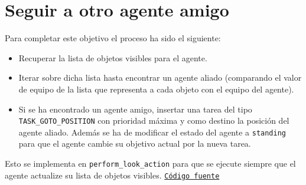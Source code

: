 \documentclass[12pt, a4paper]{article}
\begin{document}
    \section{Seguir a otro agente amigo}
    Para completar este objetivo el proceso ha sido el siguiente:
    \begin{itemize}
        \item Recuperar la lista de objetos visibles para el agente.
        \item Iterar sobre dicha lista hasta encontrar un agente aliado (comparando el valor de equipo de la lista que representa a cada objeto con el equipo del agente).
        \item Si se ha encontrado un agente amigo, insertar una tarea del tipo \texttt{TASK\_GOTO\_POSITION} con prioridad máxima y como destino la posición del agente aliado. Además se ha de modificar el estado del agente a \texttt{standing} para que el agente cambie su objetivo actual por la nueva tarea.
    \end{itemize}
    Esto se implementa en \texttt{perform\_look\_action} para que se ejecute siempre que el agente actualize su lista de objetos visibles.
    \href{https://github.com/kauron/etsinf3/blob/master/AIN/Lab1/jasonAgent_ALLIED_obj4.asl#L146}{\texttt{Código fuente}}
\end{document}
